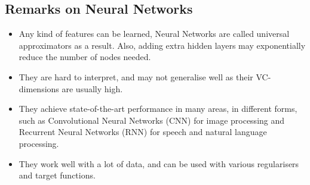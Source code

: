 \subsection{Remarks on Neural Networks}

\begin{itemize}
    \item Any kind of features can be learned, Neural Networks are called universal approximators as a result. Also, adding extra hidden layers may exponentially reduce the number of nodes needed.
    \item They are hard to interpret, and may not generalise well as their VC-dimensions are usually high.
    \item They achieve state-of-the-art performance in many areas, in different forms, such as Convolutional Neural Networks (CNN) for image processing and Recurrent Neural Networks (RNN) for speech and natural language processing.
    \item They work well with a lot of data, and can be used with various regularisers and target functions.
\end{itemize}





